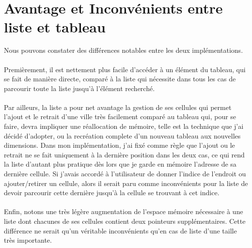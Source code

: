 \documentclass[a4paper, 11pt, oneside]{article}
\begin{document}
\section{\textbf{Avantage et Inconvénients entre liste et tableau}}
Nous pouvons constater des différences notables entre les deux implémentations.

\paragraph{} Premièrement, il est nettement plus facile d'accéder à un élément du tableau, qui se fait 
de manière directe, comparé à la liste qui nécessite dans tous les cas de parcourir toute la liste 
jusqu'à l'élément recherché.

\paragraph{} Par ailleurs, la liste a pour net avantage la gestion de ses cellules qui permet l'ajout et le retrait 
d'une ville très facilement comparé au tableau qui, pour se faire, devra impliquer une réallocation de mémoire, 
telle est la technique que j'ai décidé d'adopter, ou la recréation complete d'un nouveau tableau aux nouvelles dimensions. 
Dans mon implémentation, j'ai fixé comme règle que l'ajout ou le retrait ne se fait uniquement à la dernière position 
dans les deux cas, ce qui rend la liste d'autant plus pratique dès lors que je garde en mémoire l'adresse de sa 
dernière cellule. Si j'avais accordé à l'utilisateur de donner l'indice de l'endroit ou ajouter/retirer un cellule, 
alors il serait paru comme inconvénients pour la liste de devoir parcourir cette dernière jusqu'à la cellule se trouvant à cet indice.

\paragraph{} Enfin, notons une très légère augmentation de l'espace mémoire nécessaire à une liste dont chacunes 
de ses cellules contient deux pointeurs supplémentaires. Cette différence ne serait qu'un véritable inconvénients qu'en cas 
de liste d'une taille très importante.
\end{document}
